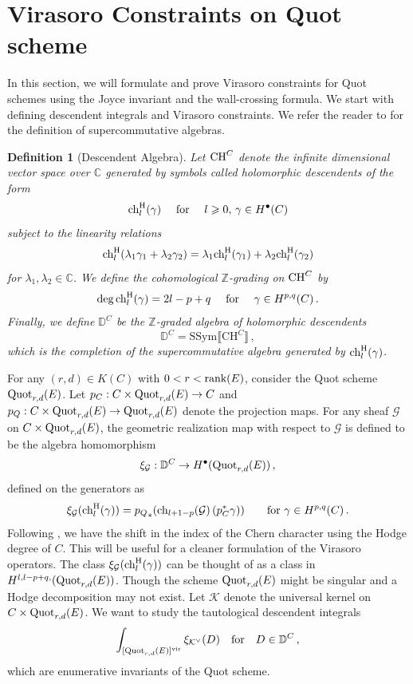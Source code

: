 \documentclass[11pt]{amsart}
\newtheorem{definition}[theorem]{Definition}
\theoremstyle{remark}
\newcommand{\Z}{\mathbb{Z}}
\newcommand{\C}{\mathbb{C}}
\newcommand{\ch}{{\rm ch}}
\newcommand{\D}{\mathbb{D}}
\newcommand{\K}{\mathcal{K}}
\newcommand{\G}{\mathcal{G}}
\newcommand{\rk}{\textnormal{rank}}
\newcommand{\quot}[0]{\textnormal{Quot}}
\newcommand{\vir}[0]{\textnormal{vir}}
\newcommand{\chh}[0]{\textnormal{ch}^\textnormal{H}}
\newcommand{\SSym}{\text{SSym}}
\newcommand{\CH}[0]{\textnormal{CH}}
\newcommand{\kv}{{\mathcal K^\vee}}
\numberwithin{theorem}{section}
\begin{document}
\section{Virasoro Constraints on Quot scheme}\label{section virasoro constraints}
    In this section, we will formulate and prove Virasoro constraints for Quot schemes using the Joyce invariant and the wall-crossing formula.
    We start with defining descendent integrals and Virasoro constraints.
    We refer the reader to \cite[Section 2.1]{BLM24} for the definition of supercommutative algebras.
\begin{definition}[Descendent Algebra]\label{definition descendent algebra}
Let $\CH^C$ denote the infinite dimensional vector space over $\C$  generated by symbols called \textit{holomorphic descendents} of the form
$$\chh_l(\gamma)\quad\textup{ for }\quad l\geqslant0,\, \gamma\in H^\bullet(C)$$
subject to the linearity relations
$$\chh_l(\lambda_1\gamma_1+\lambda_2\gamma_2)=\lambda_1\chh_l(\gamma_1)+\lambda_2\chh_l(\gamma_2)$$
for $\lambda_1, \lambda_2\in \C$. 
We define the \textit{cohomological} $\Z$-grading on $\CH^C$ by 
\begin{equation}\label{equation degree chigamma}
\deg\chh_l(\gamma) = 2l-p+q \quad \text{ for }\quad \gamma\in H^{p,q}(C)\,.
\end{equation}
Finally, we define $\D^C$ be the $\Z$-graded \textit{algebra of holomorphic descendents}
\[\D^C = \SSym\llbracket\text{CH}^C\rrbracket\,,\]
which is the completion of the supercommutative algebra generated by $\chh_l(\gamma)$. 
\end{definition}

    For any $(r,d) \in K(C)$ with $0<r<\rk(E)$, consider the Quot scheme $\quot_{r,d}(E)$. 
    Let $p_C : C \times \quot_{r,d}(E) \to C$
    and $p_Q : C \times \quot_{r,d}(E) \to \quot_{r,d}(E)$ 
    denote the projection maps.
    For any sheaf $\G$ on $C \times \quot_{r,d}(E)$,
    the geometric realization map with respect to $\G$ is 
    defined to be the algebra homomorphism
    $$ \xi_{\G} : \D^C \to H^\bullet (\quot_{r,d}(E))\,,$$
    defined on the generators as 
    $$ \xi_\G(\chh_l(\gamma)) = {p_Q}_*(\ch_{l+1-p}(\G)\,(p_C^*\gamma)) \quad \quad \text{for } \gamma \in H^{p,q}(C)\,.$$
    Following \cite{BLM24}, we have the shift in the index of the Chern character using the Hodge degree of $C$.
    This will be useful for a cleaner formulation of the Virasoro operators.
    The class $\xi_\G(\chh_l(\gamma))$ can be thought of as a class in $H^{l,l-p+q,}(\quot_{r,d}(E))$.
    Though the scheme $\quot_{r,d}(E)$ might be singular 
    and a Hodge decomposition may not exist.
    Let $\K$ denote the universal kernel on $C \times \quot_{r,d}(E)$.
    We want to study the tautological descendent integrals 
    $$ \int_{[\quot_{r,d}(E)]^\vir} \xi_\kv(D) \quad \textnormal{for} \quad  D \in \D^C\, ,$$
    which are enumerative invariants 
    of the Quot scheme.
    
\end{document}
